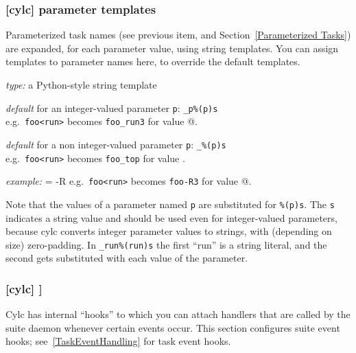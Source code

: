 \subsubsection[parameter templates]{[cylc] \textrightarrow parameter templates}
\label{RefParameterTemplates}

Parameterized task names (see previous item, and Section~\ref{Parameterized
Tasks}) are expanded, for each parameter value, using string templates.  You
can assign templates to parameter names here, to override the default templates.

\begin{myitemize}
    \item {\em type:} a Python-style string template
    \item {\em default} for an integer-valued parameter \lstinline=p=:
        \lstinline=_p%(p)s= \\
        e.g.\ \lstinline=foo<run>= becomes \lstinline=foo_run3= for
            \lstinline@run@ value @.
    \item {\em default} for a non integer-valued parameter \lstinline=p=:
        \lstinline=_%(p)s= \\
        e.g.\ \lstinline=foo<run>= becomes \lstinline=foo_top= for
            \lstinline@run@ value \lstinline@top@.
    \item {\em example:} \lstinline@run = -R%(run)s@ \\
            e.g.\ \lstinline=foo<run>= becomes \lstinline=foo-R3= for
            \lstinline@run@ value @.
\end{myitemize}

Note that the values of a parameter named \lstinline=p= are substituted for
\lstinline=%(p)s=.  The \lstinline=s= indicates a string value and should
be used even for integer-valued parameters, because cylc converts integer
parameter values to strings, with (depending on size) zero-padding. In
\lstinline=_run%(run)s= the first ``run'' is a string literal, and the second
gets substituted with each value of the parameter.

\subsubsection[{[[}events{]]}]{[cylc] \textrightarrow [[events]]}
\label{SuiteEventHandling}

Cylc has internal ``hooks'' to which you can attach handlers that are
called by the suite daemon whenever certain events occur. This section
configures suite event hooks; see~\ref{TaskEventHandling} for
task event hooks.


